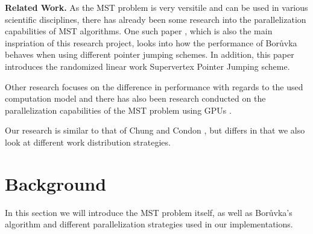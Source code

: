 \documentclass[letterpaper]{article}
\newcommand{\mypar}[1]{{\bf #1.}}
\begin{document}
\mypar{Related Work}
As the MST problem is very versitile and can be used in various scientific disciplines, there has already been some
research into the parallelization capabilities of MST algorithms. One such paper \cite{chung1996parallel}, which is also
the main inspriation of this research project, looks into how the performance of Bor\r{u}vka behaves when using
different pointer jumping schemes. In addition, this paper introduces the randomized linear work Supervertex Pointer
Jumping scheme.

Other research focuses on the difference in performance with regards to the used computation model
\cite{dehne1998practical} and there has also been research conducted on the parallelization capabilities of the MST
problem using GPUs \cite{de2017parallel}.

Our research is similar to that of Chung and Condon \cite{chung1996parallel}, but differs in that we also look at
different work distribution strategies.

%
%
%
%

\section{Background}
\label{sec:background}
In this section we will introduce the MST problem itself, as well as Bor\r{u}vka's algorithm and different
parallelization strategies used in our implementations.
\end{document}

